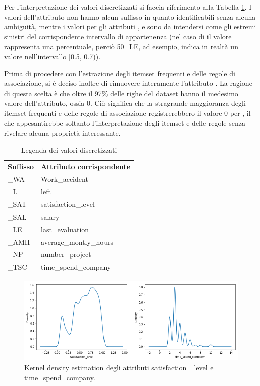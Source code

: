 \documentclass[a4paper]{article}
\begin{document}
Per l'interpretazione dei valori discretizzati si faccia riferimento alla Tabella \ref{tab:legend}. I valori dell'attributo  non hanno alcun suffisso in quanto identificabili senza alcuna ambiguità, mentre i valori per gli attributi ,  e  sono da intendersi come gli estremi sinistri del corrispondente intervallo di appartenenza (nel caso di  il valore rappresenta una percentuale, perciò 50\_LE, ad esempio, indica in realtà un valore nell'intervallo [0.5, 0.7)). 

Prima di procedere con l'estrazione degli itemset frequenti e delle regole di associazione, si è deciso inoltre di rimuovere interamente l'attributo . La ragione di questa scelta è che oltre il 97\% delle righe del dataset hanno il medesimo valore dell'attributo, ossia 0. Ciò significa che la stragrande maggioranza degli itemset frequenti e delle regole di associazione registrerebbero il valore 0 per , il che appesantirebbe soltanto l'interpretazione degli itemset e delle regole senza rivelare alcuna proprietà interessante.

\begin{table}[h]
\centering
\begingroup
\setlength{\tabcolsep}{10pt} %
\renewcommand{\arraystretch}{1.5} %
\begin{tabularx}{\textwidth}{|X|X|}
\hline
{\textbf{Suffisso}} & {\textbf{Attributo corrispondente}} \\
\_WA & Work\_accident \\
\_L & left \\
\_SAT & satisfaction\_level \\
\_SAL & salary \\
\_LE & last\_evaluation \\
\_AMH & average\_montly\_hours \\
\_NP & number\_project \\
\_TSC & time\_spend\_company \\
\hline
\end{tabularx}
\endgroup
\caption{Legenda dei valori discretizzati}
\label{tab:legend}
\end{table}

\begin{figure}
\includegraphics[width=\linewidth]{numerical_feat_distributions_new.png}

\caption{Kernel density estimation degli attributi satisfaction
\_level e time\_spend\_company.}
\label{fig:kdes}
\end{figure}
\end{document}
